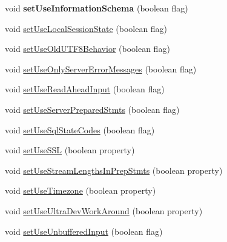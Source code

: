 \begin{DoxyCompactItemize}
\item 
\mbox{\label{interfacecom_1_1mysql_1_1jdbc_1_1_connection_properties_af65790857d69e2d201e9459d7fd8546f}} 
void {\bfseries set\+Use\+Information\+Schema} (boolean flag)
\item 
void \mbox{\hyperlink{interfacecom_1_1mysql_1_1jdbc_1_1_connection_properties_a27a764e918cf2d90a6bbedec87ce6820}{set\+Use\+Local\+Session\+State}} (boolean flag)
\item 
void \mbox{\hyperlink{interfacecom_1_1mysql_1_1jdbc_1_1_connection_properties_a0ae502be4bb0e0dca960587d7883a663}{set\+Use\+Old\+U\+T\+F8\+Behavior}} (boolean flag)
\item 
void \mbox{\hyperlink{interfacecom_1_1mysql_1_1jdbc_1_1_connection_properties_a4d6983e3fcbf208b481c59edb1aa793b}{set\+Use\+Only\+Server\+Error\+Messages}} (boolean flag)
\item 
void \mbox{\hyperlink{interfacecom_1_1mysql_1_1jdbc_1_1_connection_properties_a4c83918a441a7c5938d0ec80a975b92b}{set\+Use\+Read\+Ahead\+Input}} (boolean flag)
\item 
void \mbox{\hyperlink{interfacecom_1_1mysql_1_1jdbc_1_1_connection_properties_ace9e4d9927b8eb7afd57054f4adf6316}{set\+Use\+Server\+Prepared\+Stmts}} (boolean flag)
\item 
void \mbox{\hyperlink{interfacecom_1_1mysql_1_1jdbc_1_1_connection_properties_a479e40c9b5781e950ec3fca32646964b}{set\+Use\+Sql\+State\+Codes}} (boolean flag)
\item 
void \mbox{\hyperlink{interfacecom_1_1mysql_1_1jdbc_1_1_connection_properties_a34adc2d834bd1ce90f8c8e65498906bd}{set\+Use\+S\+SL}} (boolean property)
\item 
void \mbox{\hyperlink{interfacecom_1_1mysql_1_1jdbc_1_1_connection_properties_a34c1ecb9d6258a0289516696cf8537be}{set\+Use\+Stream\+Lengths\+In\+Prep\+Stmts}} (boolean property)
\item 
void \mbox{\hyperlink{interfacecom_1_1mysql_1_1jdbc_1_1_connection_properties_a7f57a800fefe86a58c1ddfe7fd7d8ef2}{set\+Use\+Timezone}} (boolean property)
\item 
void \mbox{\hyperlink{interfacecom_1_1mysql_1_1jdbc_1_1_connection_properties_af0a84465de479a1eea05763a2ae4cc37}{set\+Use\+Ultra\+Dev\+Work\+Around}} (boolean property)
\item 
void \mbox{\hyperlink{interfacecom_1_1mysql_1_1jdbc_1_1_connection_properties_a5a30b9513cdbfaf75d822a3942c5bf6b}{set\+Use\+Unbuffered\+Input}} (boolean flag)

\end{DoxyCompactItemize}
